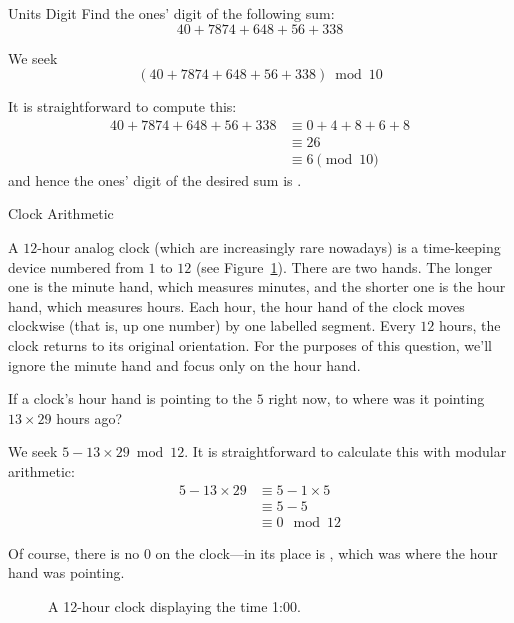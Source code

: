 \documentclass[a4paper,10pt]{report}
\begin{document}
\begin{problem}{Units Digit}
 Find the ones' digit of the following sum: \[
  40 + 7874 + 648 + 56 + 338
 \]

 \begin{solution}
  We seek \[
   (40 + 7874 + 648 + 56 + 338) \bmod 10
  \]

  It is straightforward to compute this: \begin{align*}
   40 + 7874 + 648 + 56 + 338
   &\equiv 0 + 4 + 8 + 6 + 8 \\
   &\equiv 26 \\
   &\equiv 6 \pmod {10}
  \end{align*}
  and hence the ones' digit of the desired sum is .
 \end{solution}
\end{problem}

\begin{problem}{Clock Arithmetic}

 A \(12\)-hour analog clock (which are increasingly rare nowadays) is a
 time-keeping device numbered from \(1\) to \(12\) (see Figure~\ref{ma:clock}).
 There are two hands. The longer one is the minute hand, which measures
 minutes, and the shorter one is the hour hand, which measures hours. Each
 hour, the hour hand of the clock moves clockwise (that is, up one number) by
 one labelled segment. Every \(12\) hours, the clock returns to its original
 orientation. For the purposes of this question, we'll ignore the minute hand
 and focus only on the hour hand.

 If a clock's hour hand is pointing to the \(5\) right now, to where was it
 pointing \(13\times29\) hours ago?

 \begin{solution}
  We seek \(5 - 13 \times 29 \bmod 12\). It is straightforward to calculate
  this with modular arithmetic: \begin{align*}
   5 - 13 \times 29
   &\equiv 5 - 1 \times 5 \\
   &\equiv 5 - 5 \\
   &\equiv 0 \mod {12}
  \end{align*}

  Of course, there is no \(0\) on the clock---in its place is , which
  was where the hour hand was pointing.
 \end{solution}

\end{problem}

\begin{figure}
 \fgClock{}

 \caption{A 12-hour clock displaying the time 1:00.}

 \label{ma:clock}
\end{figure}
\end{document}
